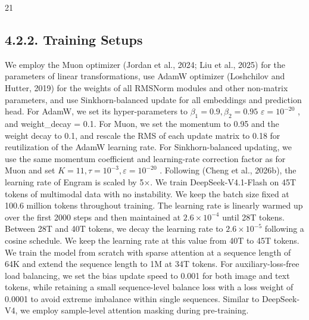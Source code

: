 \documentclass[
  10
]{article}
\begin{document}
21

\subsection{4.2.2. Training Setups}\label{training-setups}

We employ the Muon optimizer (Jordan et al., 2024; Liu et al., 2025) for
the parameters of linear transformations, use AdamW optimizer
(Loshchilov and Hutter, 2019) for the weights of all RMSNorm modules and
other non-matrix parameters, and use Sinkhorn-balanced update for all
embeddings and prediction head. For AdamW, we set its hyper-parameters
to \(\beta _ { 1 } = 0 . 9 , \beta _ { 2 } = 0 . 9 5\)
\(\varepsilon = 1 0 ^ { - 2 0 }\) , and weight\_decay = 0.1. For Muon,
we set the momentum to 0.95 and the weight decay to 0.1, and rescale the
RMS of each update matrix to 0.18 for reutilization of the AdamW
learning rate. For Sinkhorn-balanced updating, we use the same momentum
coefficient and learning-rate correction factor as for Muon and set
\(K = 1 1 , \tau = 1 0 ^ { - 3 } , \varepsilon = 1 0 ^ { - 2 0 }\) .
Following (Cheng et al., 2026b), the learning rate of Engram is scaled
by 5×. We train DeepSeek-V4.1-Flash on 45T tokens of multimodal data
with no instability. We keep the batch size fixed at 100.6 million
tokens throughout training. The learning rate is linearly warmed up over
the first 2000 steps and then maintained at
\(2 . 6 \times 1 0 ^ { - 4 }\) until 28T tokens. Between 28T and 40T
tokens, we decay the learning rate to \(2 . 6 \times 1 0 ^ { - 5 }\)
following a cosine schedule. We keep the learning rate at this value
from 40T to 45T tokens. We train the model from scratch with sparse
attention at a sequence length of 64K and extend the sequence length to
1M at 34T tokens. For auxiliary-loss-free load balancing, we set the
bias update speed to 0.001 for both image and text tokens, while
retaining a small sequence-level balance loss with a loss weight of
0.0001 to avoid extreme imbalance within single sequences. Similar to
DeepSeek-V4, we employ sample-level attention masking during
pre-training.
\end{document}
